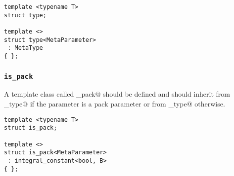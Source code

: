 \begin{verbatim}
template <typename T>
struct type;

template <>
struct type<MetaParameter>
 : MetaType
{ };
\end{verbatim}

\subsubsection{\texttt{is\_pack}}

A template class called \verb@is_pack@ should be defined and should
inherit from \verb@true_type@ if the parameter is a pack
parameter or from \verb@false_type@ otherwise.

\begin{verbatim}
template <typename T>
struct is_pack;

template <>
struct is_pack<MetaParameter>
 : integral_constant<bool, B>
{ };
\end{verbatim}

